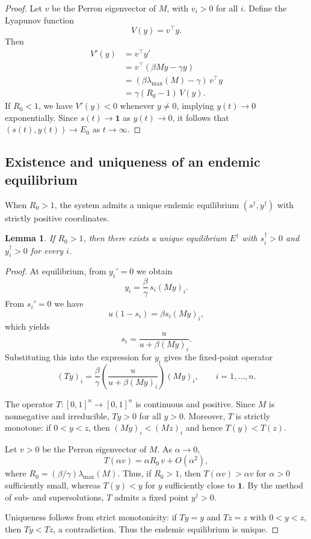 \documentclass[final,3p,times,twocolumn]{elsarticle}
\newtheorem{lemma}{Lemma}
\begin{document}
\begin{proof}
Let $v$ be the Perron eigenvector of $M$, with $v_i>0$ for all $i$.
Define the Lyapunov function
\[
    V(y) = v^\top y.
\]
Then
\begin{align*}
    V'(y)
        &= v^\top y' \\
        &= v^\top (\beta M y - \gamma y) \\
        &= (\beta \lambda_{\max}(M) - \gamma)\, v^\top y \\
        &= \gamma (R_0 - 1)\, V(y).
\end{align*}
If $R_0<1$, we have $V'(y)<0$ whenever $y\neq 0$, implying 
$y(t)\to 0$ exponentially.
Since $s(t)\to \mathbf{1}$ as $y(t)\to 0$, it follows that
$(s(t),y(t))\to E_0$ as $t\to\infty$.
\end{proof}

\subsection{Existence and uniqueness of an endemic equilibrium}

When $R_0>1$, the system admits a unique endemic equilibrium 
$(s^\dagger,y^\dagger)$ with strictly positive coordinates.

\begin{lemma}
If $R_0>1$, then there exists a unique equilibrium $E^\dagger$ with
$s_i^\dagger>0$ and $y_i^\dagger>0$ for every $i$.
\end{lemma}

\begin{proof}
At equilibrium, from $y_i'=0$ we obtain
\[
    y_i = \frac{\beta}{\gamma}\, s_i (My)_i.
\]
From $s_i'=0$ we have
\[
    u(1-s_i) = \beta s_i (My)_i,
\]
which yields
\[
    s_i = \frac{u}{u + \beta (My)_i}.
\]
Substituting this into the expression for $y_i$ gives the fixed-point operator
\[
    (Ty)_i
    =
    \frac{\beta}{\gamma}
    \left(
        \frac{u}{u + \beta (My)_i}
    \right)
    (My)_i,
    \qquad i=1,\dots,n.
\]

The operator $T:[0,1]^n\to [0,1]^n$ is continuous and positive.
Since $M$ is nonnegative and irreducible, $Ty>0$ for all $y>0$.
Moreover, $T$ is strictly monotone: if $0<y<z$, then
$(My)_i < (Mz)_i$ and hence $T(y) < T(z)$.

Let $v>0$ be the Perron eigenvector of $M$.  
As $\alpha\to 0$,
\[
    T(\alpha v)
    =
    \alpha R_0\, v + O(\alpha^2),
\]
where $R_0 = (\beta/\gamma)\lambda_{\max}(M)$.
Thus, if $R_0>1$, then $T(\alpha v)>\alpha v$ for $\alpha>0$ sufficiently small,
whereas $T(y)<y$ for $y$ sufficiently close to $\mathbf{1}$.
By the method of sub- and supersolutions, $T$ admits a fixed point $y^\dagger>0$.

Uniqueness follows from strict monotonicity:  
if $Ty=y$ and $Tz=z$ with $0<y<z$, then $Ty<Tz$, a contradiction.
Thus the endemic equilibrium is unique.
\end{proof}
\end{document}
